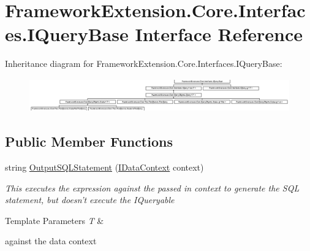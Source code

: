\hypertarget{interface_framework_extension_1_1_core_1_1_interfaces_1_1_i_query_base}{\section{Framework\-Extension.\-Core.\-Interfaces.\-I\-Query\-Base Interface Reference}
\label{interface_framework_extension_1_1_core_1_1_interfaces_1_1_i_query_base}
}
Inheritance diagram for Framework\-Extension.\-Core.\-Interfaces.\-I\-Query\-Base\-:\begin{figure}[H]
\begin{center}
\leavevmode
\includegraphics[height=1.435897cm]{interface_framework_extension_1_1_core_1_1_interfaces_1_1_i_query_base}
\end{center}
\end{figure}
\subsection*{Public Member Functions}
\begin{DoxyCompactItemize}
\item 
string \hyperlink{interface_framework_extension_1_1_core_1_1_interfaces_1_1_i_query_base_accf6af70d0aea2df1721e910e9217f48}{Output\-S\-Q\-L\-Statement} (\hyperlink{interface_framework_extension_1_1_core_1_1_interfaces_1_1_i_data_context}{I\-Data\-Context} context)
\begin{DoxyCompactList}\small\item\em This executes the expression against the passed in context to generate the S\-Q\-L statement, but doesn't execute the I\-Queryable
\begin{DoxyTemplParams}{Template Parameters}
{\em T} & \\
\hline
\end{DoxyTemplParams}
against the data context \end{DoxyCompactList}\end{DoxyCompactItemize}


